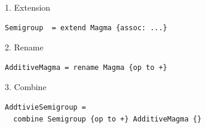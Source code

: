 \documentclass[t,10pt,numbers,fleqn,usenames,xcolor=dvipsnames]{beamer}
\begin{document}
\begin{frame}[fragile]
\begin{overprint}
\begin{columns}
\begin{column}{0.45\textwidth}
\scriptsize{1. Extension}
\begin{verbatim}
Semigroup  = extend Magma {assoc: ...}
\end{verbatim}
\vspace{0.3cm}
\scriptsize{2. Rename}
\begin{verbatim}
AdditiveMagma = rename Magma {op to +} 
\end{verbatim}
\vspace{0.3cm}
\scriptsize{3. Combine}
\begin{verbatim}
AddtivieSemigroup = 
  combine Semigroup {op to +} AdditiveMagma {} 
\end{verbatim}
\end{column}
\begin{column}{0.45\textwidth}
{\scriptsize
{}
}
\end{column}
\end{columns}
\end{overprint}
\end{frame}
\end{document}
